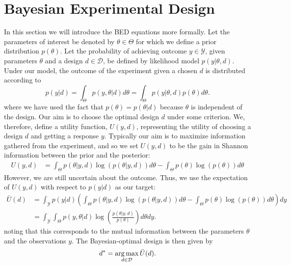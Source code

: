 
\section{Bayesian Experimental Design}
\label{sec:design:bed}

In this section we will introduce the BED equations more formally.
Let the parameters of interest be denoted by $\theta \in \Theta$ for which we define a prior distribution $p(\theta)$.
Let the probability of achieving outcome $y\in\mathcal{Y}$, given parameters $\theta$ 
and a design $d \in \mathcal{D}$, be defined by likelihood model $p(y | \theta, d)$.
Under our model, the outcome of the experiment given a chosen $d$ is distributed according to
\begin{equation}
\label{eq:marginal_def}
p(y | d) = \int_{\Theta} p(y,\theta | d) d\theta = \int_{\Theta} p(y | \theta, d) p(\theta) d\theta.
\end{equation}
where we have used the fact that $p(\theta)=p(\theta|d)$ because $\theta$ is independent of the design.
Our aim is to choose the optimal design $d$ under some criterion. 
We, therefore, define a utility function, $U(y,d)$, representing the utility of choosing a design $d$ 
and getting a response $y$.
Typically our aim is to maximize information gathered from the experiment, and so we set 
$U(y,d)$ to be the gain in Shannon information between the prior and the posterior:
\begin{align}
\label{eq:shannon_inf}
U(y,d) &= \int_{\Theta} p(\theta |y, d) \log(p(\theta |y, d)) d\theta -\int_{\Theta} p(\theta) \log(p(\theta))d\theta
\end{align}
However, we are still uncertain about the outcome. Thus, we use the expectation of $U(y,d)$ with respect to $p(y | d)$
as our target:
\begin{align}
\bar{U}(d) 
&=\int_{\mathcal{Y}} p(y|d) \left(
\int_{\Theta} p(\theta | y, d)\log(p(\theta |y, d)) d\theta - 
\int_{\Theta} p(\theta) \log(p(\theta)) d\theta \right) dy \nonumber\\
&=\int_{\mathcal{Y}}\int_{\Theta} p(y,\theta | d)\log\left(\frac{p(\theta |y, d)}{p(\theta)}\right)d\theta dy. 
\label{eq:u_bar_1}
\end{align}
noting that this corresponds to the mutual information between the parameters $\theta$ and
the observations $y$.  The Bayesian-optimal design is then given by
\begin{equation}
\label{eq:d_star}
d^* = \operatorname*{arg\,max}_{d \in \mathcal{D}} \bar{U}(d).
\end{equation}

